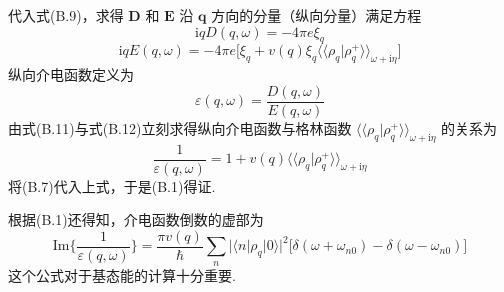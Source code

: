 代入式(B.9)，求得 $\boldsymbol{D}$ 和 $\boldsymbol{E}$ 沿 $\boldsymbol{q}$ 方向的分量（纵向分量）满足方程
\begin{equation}
\mathrm{i}qD(q,\omega)=-4\pi e\xi_{q}
\end{equation}
\begin{equation}
\mathrm{i}qE(q,\omega)=-4\pi e\bigl[\xi_{q}+v(q)\xi_{q}
\langle\langle\rho_{q}|\rho_{q}^{+}\rangle\rangle_{\omega+\mathrm{i}\eta}
\bigr]
\end{equation}
纵向介电函数定义为
\begin{equation}
\varepsilon(q,\omega)=\frac{D(q,\omega)}{E(q,\omega)}
\end{equation}
由式(B.11)与式(B.12)立刻求得纵向介电函数与格林函数
$\langle\langle\rho_{q}|\rho_{q}^{+}\rangle\rangle_{\omega+\mathrm{i}\eta}$ 的关系为
\begin{equation}
\frac{1}{\varepsilon(q,\omega)}=1+v(q)
\langle\langle\rho_{q}|\rho_{q}^{+}\rangle\rangle_{\omega+\mathrm{i}\eta}
\end{equation}
将(B.7)代入上式，于是(B.1)得证.

根据(B.1)还得知，介电函数倒数的虚部为
\begin{equation}
\mathrm{Im}\biggl\{\frac{1}{\varepsilon(q,\omega)}\biggr\}
=\frac{\pi v(q)}{\hbar}\sum_{n}|\langle n|\rho_{q}|0\rangle|^{2}
\bigl[\delta(\omega+\omega_{n0})-\delta(\omega-\omega_{n0})\bigr]
\end{equation}
这个公式对于基态能的计算十分重要.
